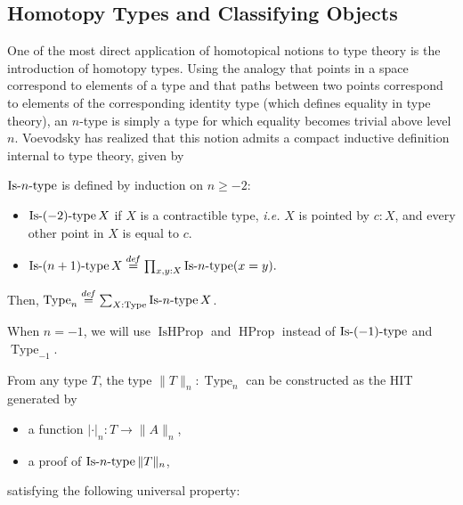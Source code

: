 \documentclass[notfinal]{jfrarticle}
\DeclareMathOperator{\Type}{Type}
\DeclareMathOperator{\HProp}{HProp}
\DeclareMathOperator{\IsHProp}{IsHProp}
\DeclareMathOperator{\Contr}{Contr}
\DeclareMathOperator{\IsContr}{IsContr}
\newcommand \defeq {\overset{de\hspace{-0.2ex}f}{=}}
\def\mymathhyphen{{\hbox{-}}}
\newcommand{\IsType}[1]
{\mathop{\mathrm{Is\mymathhyphen}#1\mathrm{\mymathhyphen type}} }
\newcommand \squash[1] {\| #1 \| }
\newcommand{\ie}{\emph{i.e.}}
\newcommand{\eg}{\emph{e.g.}}
\begin{document}
 
 \subsection{Homotopy Types and Classifying Objects}
\label{ssec:hott}

One of the most direct application of homotopical notions to type
theory is the introduction of homotopy types. 
%
Using the analogy that points in a space correspond to elements of a
type and that paths between two points correspond to 
elements of the corresponding identity type (which defines equality in type theory),  
%
an $n$-type is simply a type
for which equality becomes trivial above level $n$. 
%
Voevodsky has realized that this notion admits a compact inductive definition
internal to type theory, given by
\begin{defi}
  $\IsType n$ is defined by induction on $n\geqslant -2$:
  \begin{itemize}
  \item $\IsType {(-2)} X$ if $X$ is a contractible type, \ie{} $X$
    is pointed by $c:X$, and every other point in $X$ is equal to $c$.
  \item $\IsType {(n+1)} X \defeq \prod_{x,y:X} \IsType n (x=y).$
  \end{itemize}
  Then, $\Type_n \defeq \sum_{X:\Type} \IsType n X$.
\end{defi}
%
When $n=-1$, we will use $\IsHProp$ and $\HProp$ instead of
$\IsType{(-1)}$ and $\Type_{-1}$. 


From any type $T$, the type
$\|T\|_n:\Type_n$ can be constructed as the HIT generated by
\begin{itemize}
\item a function $|\cdot|_n : T \to \|A\|_n$,
\item a proof of $\IsType n \|T\|_n$,
\end{itemize}
 satisfying the following universal property:
\end{document}
